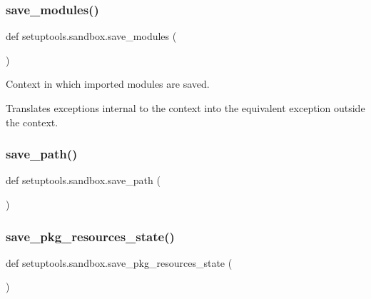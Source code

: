 \mbox{\label{namespacesetuptools_1_1sandbox_a03b1ef3f49621d5d24d9847920d2a71a}} 
\subsubsection{\texorpdfstring{save\+\_\+modules()}{save\_modules()}}
{\footnotesize\ttfamily def setuptools.\+sandbox.\+save\+\_\+modules (\begin{DoxyParamCaption}{ }\end{DoxyParamCaption})}

\begin{DoxyVerb}Context in which imported modules are saved.

Translates exceptions internal to the context into the equivalent exception
outside the context.
\end{DoxyVerb}
 \mbox{\label{namespacesetuptools_1_1sandbox_a057c8a6e653446a00924ea4809b63dc6}} 
\subsubsection{\texorpdfstring{save\+\_\+path()}{save\_path()}}
{\footnotesize\ttfamily def setuptools.\+sandbox.\+save\+\_\+path (\begin{DoxyParamCaption}{ }\end{DoxyParamCaption})}

\mbox{\label{namespacesetuptools_1_1sandbox_a7f34d1ea59a8595bed11a0c2f0e84aef}} 
\subsubsection{\texorpdfstring{save\+\_\+pkg\+\_\+resources\+\_\+state()}{save\_pkg\_resources\_state()}}
{\footnotesize\ttfamily def setuptools.\+sandbox.\+save\+\_\+pkg\+\_\+resources\+\_\+state (\begin{DoxyParamCaption}{ }\end{DoxyParamCaption})}


